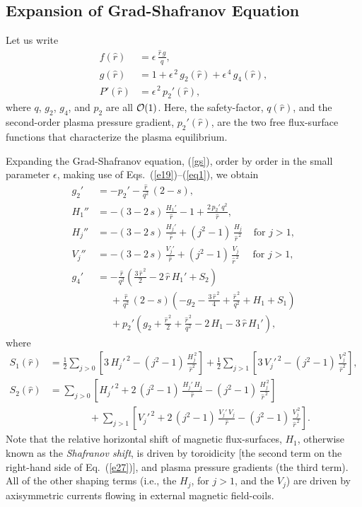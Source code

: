 \documentclass[12pt,prb,aps]{revtex4-1}
\begin{document}
\subsection{Expansion of Grad-Shafranov Equation}\label{exp}
Let us write
\begin{align}\label{e26v}
f(\hat{r})&= \epsilon\,\frac{\hat{r}\,g}{q},\\[0.5ex]
g(\hat{r}) &= 1+ \epsilon^{\,2}\,g_2(\hat{r}) + \epsilon^{\,4}\,g_4(\hat{r}),\label{e27v}\\[0.5ex]
P'(\hat{r}) &= \epsilon^{\,2}\,p_2'(\hat{r}),\label{eq1}
\end{align}
where $q$,  $g_2$, $g_4$, and $p_2$ are all ${\cal O}(1)$. Here, the safety-factor, $q(\hat{r})$, and the second-order plasma
pressure gradient, $p_2'(\hat{r})$, are the two free flux-surface functions that characterize the plasma equilibrium.\cite{gs1} 

Expanding the Grad-Shafranov equation, (\ref{gs}), order by order in the
small parameter $\epsilon$, making use of Eqs.~(\ref{e19})--(\ref{eq1}), we obtain\,\cite{con0,connor,gim,fitz2024}
\begin{align}
g_2'&=- p_2' - \frac{\hat{r}}{q^2}\,(2-s),\label{e26}\\[0.5ex]
H_1''&= -(3-2\,s)\,\frac{H_1' }{\hat{r}}
-1+\frac{2\,p_2'\,q^2}{\hat{r}},\label{e27}\\[0.5ex]
H_j''&= -(3-2\,s)\,\frac{H_j'}{\hat{r}}+(j^2-1)\,\frac{H_j}{\hat{r}^{\,2}}~~~~~\mbox{for $j>1$},\label{e33x}\\[0.5ex]
V_j''&= -(3-2\,s)\,\frac{V_j'}{\hat{r}}+(j^2-1)\,\frac{V_j}{\hat{r}^{\,2}}~~~~~~\mbox{for $j>1$},\label{e28}\\[0.5ex]
g_4'&= -\frac{\hat{r}}{q^2}\left(
\frac{3\,\hat{r}^{\,2}}{2}-2\,\hat{r}\,H_1'+S_2\right)\nonumber\\[0.5ex]
&\phantom{=}
+\frac{\hat{r}}{q^2}\,(2-s)\left(-g_2-\frac{3\,\hat{r}^{\,2}}{4} +\frac{\hat{r}^{\,2}}{q^2}+H_1 +S_1\right)\nonumber\\[0.5ex]
&\phantom{=}
+p_2'\left(g_2+\frac{\hat{r}^{\,2}}{2}+\frac{\hat{r}^{\,2}}{q^2}-2\,H_1-3\,\hat{r}\,H_1'\right),\label{e31}
\end{align}
where
\begin{align}
S_1(\hat{r})&=\frac{1}{2}\sum_{j>0} \left[3\,H_j'^{\,2} -(j^2-1)\,\frac{H_j^{\,2}}{\hat{r}^2}\right]
 +\frac{1}{2}\sum_{j>1} \left[3\,V_j'^{\,2} -(j^2-1)\,\frac{V_j^{\,2}}{\hat{r}^2}\right],\\[0.5ex]
S_2(\hat{r})&=\sum_{j>0}\left[H_j'^{\,2}+2\,(j^2-1)\,\frac{H_j'\,H_j}{\hat{r}}-(j^2-1)\,\frac{H_j^{\,2}}{\hat{r}^{\,2}}\right]\nonumber\\[0.5ex]
&\phantom{===}+\sum_{j>1}\left[V_j'^{\,2}+2\,(j^2-1)\,\frac{V_j'\,V_j}{\hat{r}}-(j^2-1)\,\frac{V_j^{\,2}}{\hat{r}^{\,2}}\right].
\end{align}
Note that the relative horizontal shift of magnetic flux-surfaces, $H_1$, otherwise known as the {\em Shafranov shift},\cite{shaf} is driven by toroidicity [the second term on
the right-hand side of Eq.~(\ref{e27})], and plasma pressure gradients (the third term). All of the other shaping terms (i.e., the $H_j$, for $j>1$, and
the $V_j$) are driven by axisymmetric currents flowing in external  magnetic field-coils.\cite{fitz2024} 
\end{document}
